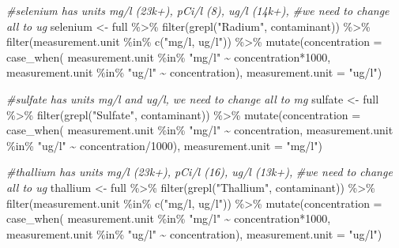 \documentclass[12pt, twoside]{amherstthesis}
\newenvironment{Shaded}{\begin{snugshade}}{\end{snugshade}}
\newcommand{\AttributeTok}[1]{\textcolor[rgb]{0.77,0.63,0.00}{#1}}
\newcommand{\CommentTok}[1]{\textcolor[rgb]{0.56,0.35,0.01}{\textit{#1}}}
\newcommand{\DecValTok}[1]{\textcolor[rgb]{0.00,0.00,0.81}{#1}}
\newcommand{\FunctionTok}[1]{\textcolor[rgb]{0.00,0.00,0.00}{#1}}
\newcommand{\NormalTok}[1]{#1}
\newcommand{\OtherTok}[1]{\textcolor[rgb]{0.56,0.35,0.01}{#1}}
\newcommand{\SpecialCharTok}[1]{\textcolor[rgb]{0.00,0.00,0.00}{#1}}
\newcommand{\StringTok}[1]{\textcolor[rgb]{0.31,0.60,0.02}{#1}}
\begin{document}
\begin{Shaded}
\begin{Highlighting}[]
\CommentTok{\#selenium has units mg/l (23k+), pCi/l (8), ug/l (14k+), }
\CommentTok{\#we need to change all to ug}
\NormalTok{selenium }\OtherTok{\textless{}{-}}\NormalTok{ full }\SpecialCharTok{\%\textgreater{}\%}
  \FunctionTok{filter}\NormalTok{(}\FunctionTok{grepl}\NormalTok{(}\StringTok{"Radium"}\NormalTok{, contaminant)) }\SpecialCharTok{\%\textgreater{}\%}
  \FunctionTok{filter}\NormalTok{(measurement.unit }\SpecialCharTok{\%in\%} \FunctionTok{c}\NormalTok{(}\StringTok{"mg/l, ug/l"}\NormalTok{)) }\SpecialCharTok{\%\textgreater{}\%}
  \FunctionTok{mutate}\NormalTok{(}\AttributeTok{concentration =} 
           \FunctionTok{case\_when}\NormalTok{(}
\NormalTok{             measurement.unit }\SpecialCharTok{\%in\%} \StringTok{"mg/l"} \SpecialCharTok{\textasciitilde{}}\NormalTok{ concentration}\SpecialCharTok{*}\DecValTok{1000}\NormalTok{,}
\NormalTok{             measurement.unit }\SpecialCharTok{\%in\%} \StringTok{"ug/l"} \SpecialCharTok{\textasciitilde{}}\NormalTok{ concentration),}
         \AttributeTok{measurement.unit =} \StringTok{"ug/l"}\NormalTok{)  }

\CommentTok{\#sulfate has units mg/l and ug/l, we need to change all to mg}
\NormalTok{sulfate }\OtherTok{\textless{}{-}}\NormalTok{ full }\SpecialCharTok{\%\textgreater{}\%}
  \FunctionTok{filter}\NormalTok{(}\FunctionTok{grepl}\NormalTok{(}\StringTok{"Sulfate"}\NormalTok{, contaminant)) }\SpecialCharTok{\%\textgreater{}\%}
  \FunctionTok{mutate}\NormalTok{(}\AttributeTok{concentration =} 
           \FunctionTok{case\_when}\NormalTok{(}
\NormalTok{             measurement.unit }\SpecialCharTok{\%in\%} \StringTok{"mg/l"} \SpecialCharTok{\textasciitilde{}}\NormalTok{ concentration,}
\NormalTok{             measurement.unit }\SpecialCharTok{\%in\%} \StringTok{"ug/l"} \SpecialCharTok{\textasciitilde{}}\NormalTok{ concentration}\SpecialCharTok{/}\DecValTok{1000}\NormalTok{),}
         \AttributeTok{measurement.unit =} \StringTok{"mg/l"}\NormalTok{)}

\CommentTok{\#thallium has units mg/l (23k+), pCi/l (16), ug/l (13k+), }
\CommentTok{\#we need to change all to ug}
\NormalTok{thallium }\OtherTok{\textless{}{-}}\NormalTok{ full }\SpecialCharTok{\%\textgreater{}\%}
  \FunctionTok{filter}\NormalTok{(}\FunctionTok{grepl}\NormalTok{(}\StringTok{"Thallium"}\NormalTok{, contaminant)) }\SpecialCharTok{\%\textgreater{}\%}
  \FunctionTok{filter}\NormalTok{(measurement.unit }\SpecialCharTok{\%in\%} \FunctionTok{c}\NormalTok{(}\StringTok{"mg/l, ug/l"}\NormalTok{)) }\SpecialCharTok{\%\textgreater{}\%}
  \FunctionTok{mutate}\NormalTok{(}\AttributeTok{concentration =} 
           \FunctionTok{case\_when}\NormalTok{(}
\NormalTok{             measurement.unit }\SpecialCharTok{\%in\%} \StringTok{"mg/l"} \SpecialCharTok{\textasciitilde{}}\NormalTok{ concentration}\SpecialCharTok{*}\DecValTok{1000}\NormalTok{,}
\NormalTok{             measurement.unit }\SpecialCharTok{\%in\%} \StringTok{"ug/l"} \SpecialCharTok{\textasciitilde{}}\NormalTok{ concentration),}
         \AttributeTok{measurement.unit =} \StringTok{"ug/l"}\NormalTok{)  }


\end{Highlighting}
\end{Shaded}
\end{document}
